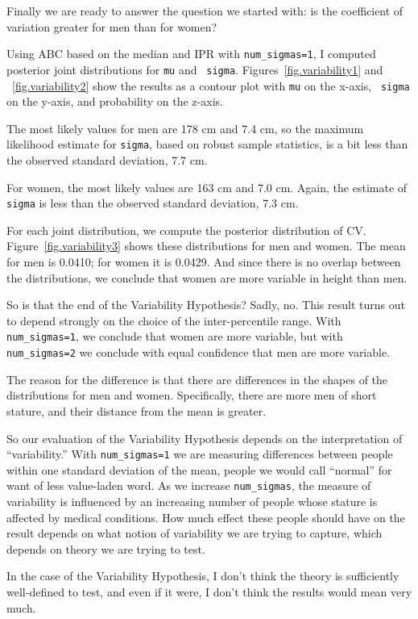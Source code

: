 \documentclass[12pt]{book}
\begin{document}
Finally we are ready to answer the question we started with: is the
coefficient of variation greater for men than for women?

Using ABC based on the median and IPR with \verb"num_sigmas=1", I
computed posterior joint distributions for {\tt mu} and {\tt
  sigma}.  Figures~\ref{fig.variability1} and ~\ref{fig.variability2}
show the results as a contour plot with {\tt mu} on the x-axis, {\tt
  sigma} on the y-axis, and probability on the z-axis.

The most likely values for men are 178 cm and 7.4 cm, so the
maximum likelihood estimate for {\tt sigma}, based on robust
sample statistics, is a bit less than the observed
standard deviation, 7.7 cm.

For women, the most likely values are 163 cm and 7.0 cm.  Again,
the estimate of {\tt sigma} is less than the observed
standard deviation, 7.3 cm.

For each joint distribution, we compute the posterior distribution of
CV.  Figure~\ref{fig.variability3} shows these distributions for men
and women.  The mean for men is 0.0410; for women it is 0.0429.  And
since there is no overlap between the distributions, we conclude that
women are more variable in height than men.

So is that the end of the Variability Hypothesis?  Sadly, no.  This
result turns out to depend strongly on the choice of the
inter-percentile range.  With \verb"num_sigmas=1", we conclude that
women are more variable, but with \verb"num_sigmas=2" we conclude
with equal confidence that men are more variable.

The reason for the difference is that there are differences in the
shapes of the distributions for men and women.  Specifically, there
are more men of short stature, and their distance from the mean is
greater.

So our evaluation of the Variability Hypothesis depends on the
interpretation of ``variability.''  With \verb"num_sigmas=1" we are
measuring differences between people within one standard deviation of
the mean, people we would call ``normal'' for want of less value-laden
word.  As we increase \verb"num_sigmas", the measure of variability is
influenced by an increasing number of people whose stature is affected
by medical conditions.  How much effect these people should have
on the result depends on what notion of variability we are trying
to capture, which depends on theory we are trying to test.

In the case of the Variability Hypothesis, I don't think the theory
is sufficiently well-defined to test, and even if it were, I don't
think the results would mean very much.
\end{document}

